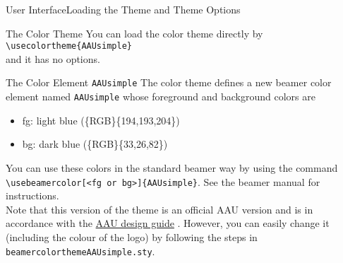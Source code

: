 \documentclass[10pt]{beamer}
\newcommand{\chref}[2]{%
  \href{#1}{{\usebeamercolor[bg]{AAUsimple}#2}}%
}
\begin{document}
\begin{frame}{User Interface}{Loading the Theme and Theme Options}
  \begin{block}{The Color Theme}
    You can load the color theme directly by\\
    {\tt \textbackslash usecolortheme\{AAUsimple\}}\\
    and it has no options.
  \end{block}
  \pause
  \begin{block}{The Color Element {\tt AAUsimple}}
    The color theme defines a new beamer color element named {\tt AAUsimple} whose foreground and background colors are
    \begin{itemize}
      \item fg: {light blue (\{RGB\}\{194,193,204\})}
      \item bg: {dark blue (\{RGB\}\{33,26,82\})}
    \end{itemize}
    You can use these colors in the standard beamer way by using the command
    {\tt \textbackslash usebeamercolor[<fg or bg>]\{AAUsimple\}}. See the beamer manual for instructions.\\
 \pause Note that this version of the theme is an official AAU version and is in accordance with the \chref{http://aau.designguides.dk/}{AAU design guide}. However, you can easily change it (including the colour of the logo) by following the steps in {\tt beamercolorthemeAAUsimple.sty}.
  \end{block}
\end{frame}
\end{document}
